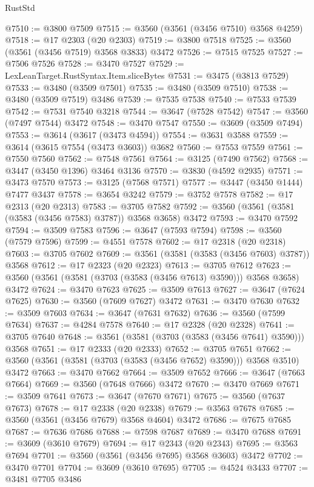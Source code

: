 \begin{lexlean}{RustStd}
\begin{coremodule}
{\begin{coremodule}
{{{{{{{{{{{{{{{{{{{{{{{{{{{{{{{{{{{{{{{{{{{{{@7510 := @3800 @7509
@7515 := @3560 (@3561 (@3456 @7510) @3568 @4259)
@7518 := @17 @2303 (@20 @2303)
@7519 := @3800 @7518
@7525 := @3560 (@3561 (@3456 @7519) @3568 @3833) @3472
@7526 := @7515 @7525
@7527 := @7506 @7526
@7528 := @3470 @7527
@7529 := LexLeanTarget.RustSyntax.Item.sliceBytes
@7531 := @3475 (@3813 @7529)
@7533 := @3480 (@3509 @7501)
@7535 := @3480 (@3509 @7510)
@7538 := @3480 (@3509 @7519) @3486
@7539 := @7535 @7538
@7540 := @7533 @7539
@7542 := @7531 @7540 @3218
@7544 := @3647 (@7528 @7542)
@7547 := @3560 (@7497 @7544) @3472
@7548 := @3470 @7547
@7550 := @3609 (@3509 @7494)
@7553 := @3614 (@3617 (@3473 @4594))
@7554 := @3631 @3588
@7559 := @3614 (@3615 @7554 (@3473 @3603)) @3682
@7560 := @7553 @7559
@7561 := @7550 @7560
@7562 := @7548 @7561
@7564 := @3125 (@7490 @7562)
@7568 := @3447 (@3450 @1396) @3464 @3136
@7570 := @3830 (@4592 @2935)
@7571 := @3473 @7570
@7573 := @3125 (@7568 @7571)
@7577 := @3447 (@3450 @1444) @7477 @3437
@7578 := @3654 @3242
@7579 := @3752 @7578
@7582 := @17 @2313 (@20 @2313)
@7583 := @3705 @7582
@7592 := @3560 (@3561 (@3581 (@3583 (@3456 @7583) @3787)) @3568 @3658) @3472
@7593 := @3470 @7592
@7594 := @3509 @7583
@7596 := @3647 (@7593 @7594)
@7598 := @3560 (@7579 @7596)
@7599 := @4551 @7578
@7602 := @17 @2318 (@20 @2318)
@7603 := @3705 @7602
@7609 := @3561 (@3581 (@3583 (@3456 @7603) @3787)) @3568
@7612 := @17 @2323 (@20 @2323)
@7613 := @3705 @7612
@7623 := @3560 (@3561 (@3581 (@3703 (@3583 (@3456 @7613) @3590))) @3568 @3658) @3472
@7624 := @3470 @7623
@7625 := @3509 @7613
@7627 := @3647 (@7624 @7625)
@7630 := @3560 (@7609 @7627) @3472
@7631 := @3470 @7630
@7632 := @3509 @7603
@7634 := @3647 (@7631 @7632)
@7636 := @3560 (@7599 @7634)
@7637 := @4284 @7578
@7640 := @17 @2328 (@20 @2328)
@7641 := @3705 @7640
@7648 := @3561 (@3581 (@3703 (@3583 (@3456 @7641) @3590))) @3568
@7651 := @17 @2333 (@20 @2333)
@7652 := @3705 @7651
@7662 := @3560 (@3561 (@3581 (@3703 (@3583 (@3456 @7652) @3590))) @3568 @3510) @3472
@7663 := @3470 @7662
@7664 := @3509 @7652
@7666 := @3647 (@7663 @7664)
@7669 := @3560 (@7648 @7666) @3472
@7670 := @3470 @7669
@7671 := @3509 @7641
@7673 := @3647 (@7670 @7671)
@7675 := @3560 (@7637 @7673)
@7678 := @17 @2338 (@20 @2338)
@7679 := @3563 @7678
@7685 := @3560 (@3561 (@3456 @7679) @3568 @4604) @3472
@7686 := @7675 @7685
@7687 := @7636 @7686
@7688 := @7598 @7687
@7689 := @3470 @7688
@7691 := @3609 (@3610 @7679)
@7694 := @17 @2343 (@20 @2343)
@7695 := @3563 @7694
@7701 := @3560 (@3561 (@3456 @7695) @3568 @3603) @3472
@7702 := @3470 @7701
@7704 := @3609 (@3610 @7695)
@7705 := @4524 @3433
@7707 := @3481 @7705 @3486
}}}}}}}}}}}}}}}}}}}}}}}}}}}}}}}}}}}}}}}}}}}}}
\end{coremodule}}
\end{coremodule}
\end{lexlean}
